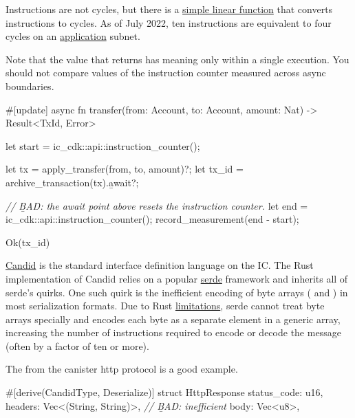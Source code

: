 \documentclass{article}
\begin{document}
Instructions are not cycles, but there is a \href{https://github.com/dfinity/ic/blob/c01d7d1b2e18490a2f70d2fdf5b6aceccab5860c/rs/cycles_account_manager/src/lib.rs#L730-L738}{simple linear function} that converts instructions to cycles.
As of July 2022, ten instructions are equivalent to four cycles on an \href{https://github.com/dfinity/ic/blob/7d3fb4ef01416241205818450156aabd21c24b34/rs/config/src/subnet_config.rs#L288-L289}{application} subnet.

Note that the value that  returns has meaning only within a single execution.
You should not compare values of the instruction counter measured across async boundaries.

\begin{code}[bad]
#[update]
async fn transfer(from: Account, to: Account, amount: Nat) -> Result<TxId, Error> {
  let start = ic_cdk::api::instruction_counter();

  let tx = apply_transfer(from, to, amount)?;
  let tx_id = archive_transaction(tx).\b{await}?;

  \emph{// \b{BAD}: the await point above resets the instruction counter.}
  let end = ic_cdk::api::instruction_counter();
  record_measurement(end - start);

  Ok(tx_id)
}
\end{code}


\href{https://github.com/dfinity/candid}{Candid} is the standard interface definition language on the IC.
The Rust implementation of Candid relies on a popular \href{https://serde.rs/}{serde} framework and inherits all of serde's quirks.
One such quirk is the inefficient encoding of byte arrays ( and \code{\[u8\]}) in most serialization formats.
Due to Rust \href{https://rust-lang.github.io/rfcs/1210-impl-specialization.html}{limitations}, serde cannot treat byte arrays specially and encodes each byte as a separate element in a generic array, increasing the number of instructions required to encode or decode the message (often by a factor of ten or more).

The  from the canister http protocol is a good example.

\begin{code}[bad]
#[derive(CandidType, Deserialize)]
struct HttpResponse {
    status_code: u16,
    headers: Vec<(String, String)>,
    \emph{// \b{BAD}: inefficient}
    body: Vec<u8>,
}
\end{code}
\end{document}
